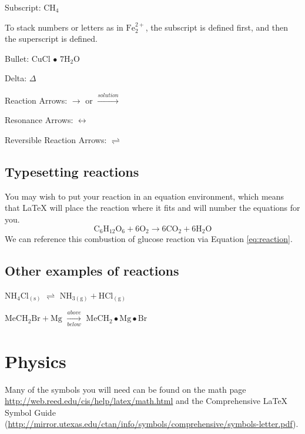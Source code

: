 \documentclass[twoside,12pt,final]{ucthesis-CA2012}
\begin{document}
\begin{ucmainmatter}
\noindent Subscript: \(\mathrm{CH_4}\)

To stack numbers or letters as in \(\mathrm{Fe_2^{2+}}\), the subscript is defined first, and then the superscript is defined.

\noindent Bullet: CuCl \(\bullet\) \(\mathrm{7H_{2}O}\)

\noindent Delta: \(\Delta\)

\noindent Reaction Arrows: \(\longrightarrow\) or \(\xrightarrow{solution}\)

\noindent Resonance Arrows: \(\leftrightarrow\)

\noindent Reversible Reaction Arrows: \(\rightleftharpoons\)

\hypertarget{typesetting-reactions}{%
\subsection{Typesetting reactions}\label{typesetting-reactions}}

You may wish to put your reaction in an equation environment, which means that LaTeX will place the reaction where it fits and will number the equations for you.
\begin{equation}
  \mathrm{C_6H_{12}O_6  + 6O_2} \longrightarrow \mathrm{6CO_2 + 6H_2O}
  \label{eq:reaction}
\end{equation}
We can reference this combustion of glucose reaction via Equation \eqref{eq:reaction}.

\hypertarget{other-examples-of-reactions}{%
\subsection{Other examples of reactions}\label{other-examples-of-reactions}}

\(\mathrm{NH_4Cl_{(s)}}\) \(\rightleftharpoons\) \(\mathrm{NH_{3(g)}+HCl_{(g)}}\)

\noindent \(\mathrm{MeCH_2Br + Mg}\) \(\xrightarrow[below]{above}\) \(\mathrm{MeCH_2\bullet Mg \bullet Br}\)

\hypertarget{physics}{%
\section{Physics}\label{physics}}

Many of the symbols you will need can be found on the math page \url{http://web.reed.edu/cis/help/latex/math.html} and the Comprehensive LaTeX Symbol Guide (\url{http://mirror.utexas.edu/ctan/info/symbols/comprehensive/symbols-letter.pdf}).


\end{ucmainmatter}
\end{document}
